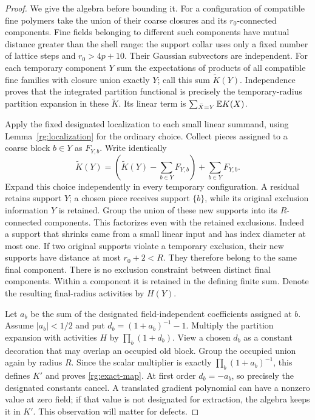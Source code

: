 \begin{proof}
We give the algebra before bounding it.  For a configuration of compatible fine polymers take the union of their coarse closures and its $r_0$-connected components.  Fine fields belonging to different such components have mutual distance greater than the shell range: the support collar uses only a fixed number of lattice steps and $r_0>4p+10$.  Their Gaussian subvectors are independent.  For each temporary component $Y$ sum the expectations of products of all compatible fine families with closure union exactly $Y$; call this sum $\widetilde K(Y)$.  Independence proves that the integrated partition functional is precisely the temporary-radius partition expansion in these $\widetilde K$.  Its linear term is $\sum_{\bar X=Y}\mathbb E K(X)$.

Apply the fixed designated localization to each small linear summand, using Lemma~\ref{rg:localization} for the ordinary choice.  Collect pieces assigned to a coarse block $b\in Y$ as $F_{Y,b}$.  Write identically
\[
 \widetilde K(Y)=\left(\widetilde K(Y)-\sum_{b\in Y}F_{Y,b}\right)+\sum_{b\in Y}F_{Y,b}.
\]
Expand this choice independently in every temporary configuration.  A residual retains support $Y$; a chosen piece receives support $\{b\}$, while its original exclusion information $Y$ is retained.  Group the union of these new supports into its $R$-connected components.  This factorizes even with the retained exclusions.  Indeed a support that shrinks came from a small linear input and has index diameter at most one.  If two original supports violate a temporary exclusion, their new supports have distance at most $r_0+2<R$.  They therefore belong to the same final component.  There is no exclusion constraint between distinct final components.  Within a component it is retained in the defining finite sum.  Denote the resulting final-radius activities by $H(Y)$.

Let $a_b$ be the sum of the designated field-independent coefficients assigned at $b$.  Assume $|a_b|<1/2$ and put $d_b=(1+a_b)^{-1}-1$.  Multiply the partition expansion with activities $H$ by
$\prod_b(1+d_b)$.  View a chosen $d_b$ as a constant decoration that may overlap an occupied old block.  Group the occupied union again by radius $R$.  Since the scalar multiplier is exactly $\prod_b(1+a_b)^{-1}$, this defines $K'$ and proves \eqref{rg:exact-map}.  At first order $d_b=-a_b$, so precisely the designated constants cancel.  A translated gradient polynomial can have a nonzero value at zero field; if that value is not designated for extraction, the algebra keeps it in $K'$.  This observation will matter for defects.


\end{proof}
